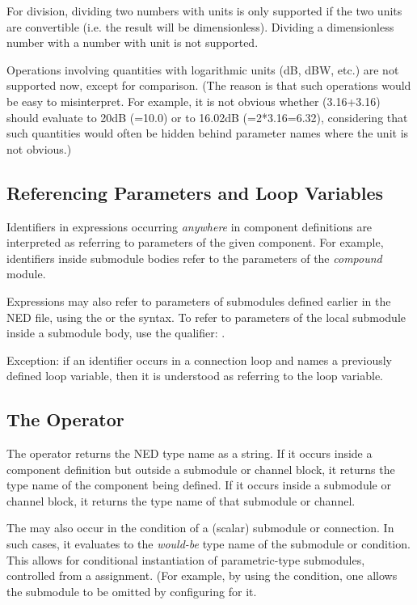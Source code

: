 For division, dividing two numbers with units is only supported if the two
units are convertible (i.e. the result will be dimensionless). Dividing
a dimensionless number with a number with unit is not supported.

Operations involving quantities with logarithmic units (dB, dBW, etc.)
are not supported now, except for comparison. (The reason is that such
operations would be easy to misinterpret. For example, it is not obvious
whether  (3.16+3.16) should evaluate to 20dB (=10.0)
or to 16.02dB (=2*3.16=6.32), considering that such quantities would
often be hidden behind parameter names where the unit is not obvious.) 
 
\subsection{Referencing Parameters and Loop Variables}
\label{sec:ned-ref:referencing-parameters-and-loop-variables}

Identifiers in expressions occurring \textit{anywhere} in component definitions
are interpreted as referring to parameters of the given component. For example,
identifiers inside submodule bodies refer to the parameters of the \textit{compound}
module.

Expressions may also refer to parameters of submodules defined earlier
in the NED file, using the  or the
 syntax. To refer to parameters
of the local submodule inside a submodule body, use the
 qualifier: .

Exception: if an identifier occurs in a connection  loop and names
a previously defined loop variable, then it is understood as referring to
the loop variable.


\subsection{The  Operator}
\label{sec:ned-ref:typename-operator}

The  operator returns the NED type name as a string.
If it occurs inside a component definition but outside a submodule or channel
block, it returns the type name of the component being defined. If it occurs
inside a submodule or channel block, it returns the type name of that submodule
or channel.

The  may also occur in the  condition of a
(scalar) submodule or connection. In such cases, it evaluates to the \textit{would-be}
type name of the submodule or condition. This allows for conditional
instantiation of parametric-type submodules, controlled from a 
 assignment. (For example, by using the 
condition, one allows the submodule to be omitted by configuring 
for it. 

